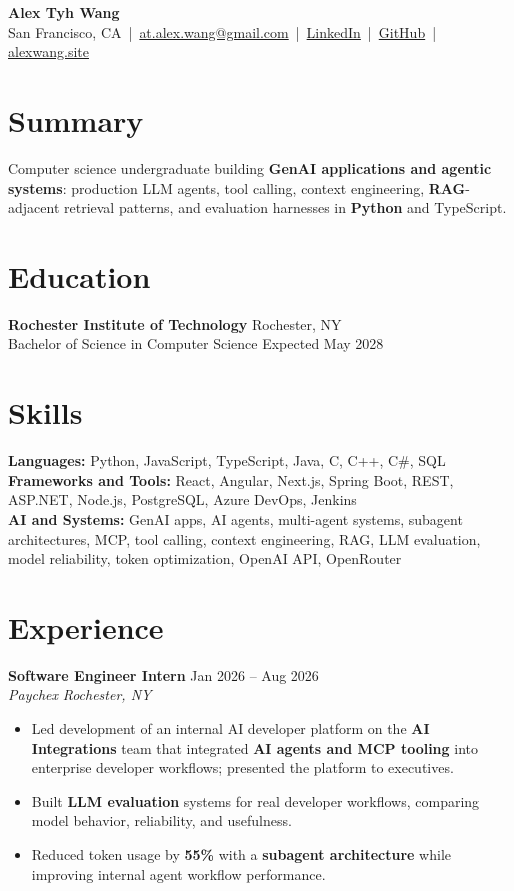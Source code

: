 \documentclass[10pt,letterpaper]{article}
\newif\ifresumeFirstRole
\newcommand{\resumeRole}[4]{%
  \ifresumeFirstRole
    \global\resumeFirstRolefalse
  \else
    \vspace{0pt plus 1fill}%
  \fi
  \textbf{#1} \hfill #2\\
  \textit{#3} \hfill \textit{#4}
}
\begin{document}
\begin{center}
{\Large \textbf{Alex Tyh Wang}}\\
San Francisco, CA \,|\, \href{mailto:at.alex.wang@gmail.com}{at.alex.wang@gmail.com} \,|\, \href{https://www.linkedin.com/in/alex-tyh-wang/}{LinkedIn} \,|\, \href{https://github.com/alextyhwang}{GitHub} \,|\, \href{https://alexwang.site}{alexwang.site}
\end{center}

\section*{Summary}
Computer science undergraduate building \textbf{GenAI applications and agentic systems}: production LLM agents, tool calling, context engineering, \textbf{RAG}-adjacent retrieval patterns, and evaluation harnesses in \textbf{Python} and TypeScript.

\section*{Education}
\textbf{Rochester Institute of Technology} \hfill Rochester, NY\\
Bachelor of Science in Computer Science \hfill Expected May 2028

\section*{Skills}
\textbf{Languages:} Python, JavaScript, TypeScript, Java, C, C++, C\#, SQL\\
\textbf{Frameworks and Tools:} React, Angular, Next.js, Spring Boot, REST, ASP.NET, Node.js, PostgreSQL, Azure DevOps, Jenkins\\
\textbf{AI and Systems:} GenAI apps, AI agents, multi-agent systems, subagent architectures, MCP, tool calling, context engineering, RAG, LLM evaluation, model reliability, token optimization, OpenAI API, OpenRouter

\section*{Experience}
\resumeRole{Software Engineer Intern}{Jan 2026 -- Aug 2026}{Paychex}{Rochester, NY}
\begin{itemize}
  \item Led development of an internal AI developer platform on the \textbf{AI Integrations} team that integrated \textbf{AI agents and MCP tooling} into enterprise developer workflows; presented the platform to executives.
  \item Built \textbf{LLM evaluation} systems for real developer workflows, comparing model behavior, reliability, and usefulness.
  \item Reduced token usage by \textbf{55\%} with a \textbf{subagent architecture} while improving internal agent workflow performance.
\end{itemize}
\end{document}

